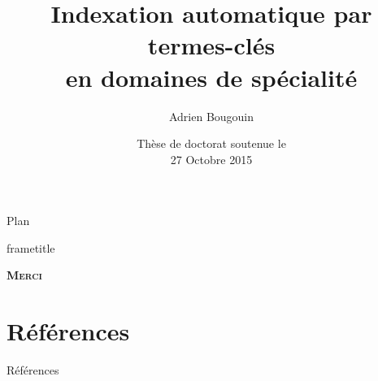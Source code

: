 \documentclass[10pt, xcolor={usenames, dvipsnames}]{beamer}
\title{Indexation automatique par termes-clés\\en domaines de spécialité}
\author{Adrien Bougouin}
\institute{\normalsize{Université de Nantes, LINA}}
\date{Thèse de doctorat soutenue le\\27 Octobre 2015}
\begin{document}

  \begin{frame}
    \titlepage
  \end{frame}

  
  \begin{frame}{Plan}
    \tableofcontents
    \cite{bougouin2013topicrank}
  \end{frame}
  
  \begin{frame}
    \vfill
    \begin{beamercolorbox}[center,shadow=false,rounded=false]{frametitle} 
      \vspace{.15em}\par
      \Huge{\textbf{\textsc{Merci}}}
      \vspace{.5em}
    \end{beamercolorbox}
    \vfill
  \end{frame}
  \section*{Références}
    \begin{frame}[allowframebreaks]{Références}
      \def\newblock{\hskip .11em plus .33em minus .07em}
      
      
    \end{frame}
\end{document}

